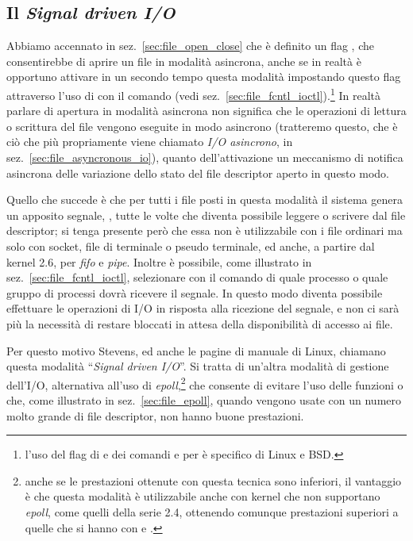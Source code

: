 \subsection{Il \textit{Signal driven I/O}}
\label{sec:signal_driven_io}


Abbiamo accennato in sez.~\ref{sec:file_open_close} che è definito un flag
, che consentirebbe di aprire un file in modalità asincrona,
anche se in realtà è opportuno attivare in un secondo tempo questa modalità
impostando questo flag attraverso l'uso di  con il comando
 (vedi sez.~\ref{sec:file_fcntl_ioctl}).\footnote{l'uso del
  flag di  e dei comandi  e 
  per  è specifico di Linux e BSD.}  In realtà parlare di apertura
in modalità asincrona non significa che le operazioni di lettura o scrittura
del file vengono eseguite in modo asincrono (tratteremo questo, che è ciò che
più propriamente viene chiamato \textsl{I/O asincrono}, in
sez.~\ref{sec:file_asyncronous_io}), quanto dell'attivazione un meccanismo di
notifica asincrona delle variazione dello stato del file descriptor aperto in
questo modo.

Quello che succede è che per tutti i file posti in questa modalità il sistema
genera un apposito segnale, , tutte le volte che diventa
possibile leggere o scrivere dal file descriptor; si tenga presente però che
essa non è utilizzabile con i file ordinari ma solo con socket, file di
terminale o pseudo terminale, ed anche, a partire dal kernel 2.6, per
\textit{fifo} e \textit{pipe}. Inoltre è possibile, come illustrato in
sez.~\ref{sec:file_fcntl_ioctl}, selezionare con il comando 
di  quale processo o quale gruppo di processi dovrà ricevere il
segnale. In questo modo diventa possibile effettuare le operazioni di I/O in
risposta alla ricezione del segnale, e non ci sarà più la necessità di restare
bloccati in attesa della disponibilità di accesso ai file.


Per questo motivo Stevens, ed anche le pagine di manuale di Linux, chiamano
questa modalità ``\textit{Signal driven I/O}''.  Si tratta di un'altra
modalità di gestione dell'I/O, alternativa all'uso di
\textit{epoll},\footnote{anche se le prestazioni ottenute con questa tecnica
  sono inferiori, il vantaggio è che questa modalità è utilizzabile anche con
  kernel che non supportano \textit{epoll}, come quelli della serie 2.4,
  ottenendo comunque prestazioni superiori a quelle che si hanno con
   e .} che consente di evitare l'uso delle funzioni
 o  che, come illustrato in sez.~\ref{sec:file_epoll},
quando vengono usate con un numero molto grande di file descriptor, non hanno
buone prestazioni.


